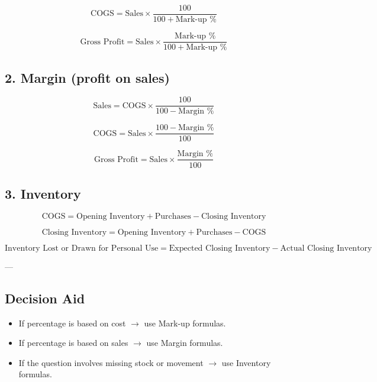 \[
\text{COGS} = \text{Sales} \times \frac{100}{100 + \text{Mark-up \%}}
\]

\[
\text{Gross Profit} = \text{Sales} \times \frac{\text{Mark-up \%}}{100 + \text{Mark-up \%}}
\]

\subsection{2. Margin (profit on sales)}

\[
\text{Sales} = \text{COGS} \times \frac{100}{100 - \text{Margin \%}}
\]

\[
\text{COGS} = \text{Sales} \times \frac{100 - \text{Margin \%}}{100}
\]

\[
\text{Gross Profit} = \text{Sales} \times \frac{\text{Margin \%}}{100}
\]

\subsection{3. Inventory}

\[
\text{COGS} = \text{Opening Inventory} + \text{Purchases} - \text{Closing Inventory}
\]

\[
\text{Closing Inventory} = \text{Opening Inventory} + \text{Purchases} - \text{COGS}
\]

\[
\text{Inventory Lost or Drawn for Personal Use} = \text{Expected Closing Inventory} - \text{Actual Closing Inventory}
\]

---

\subsection{Decision Aid}

\begin{itemize}
    \item If percentage is based on cost $\rightarrow$ use Mark-up formulas.
    \item If percentage is based on sales $\rightarrow$ use Margin formulas.
    \item If the question involves missing stock or movement $\rightarrow$ use Inventory formulas.
\end{itemize}




